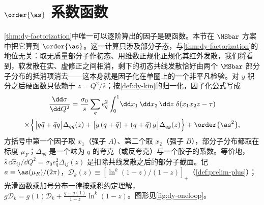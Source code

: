\section{\texorpdfstring{$\order{\as}$}{O(alpha_s)} 系数函数}\label{sec:dy-nlo}

\cref{thm:dy-factorization}中唯一可以逐阶算出的因子是硬函数。本节在 $\MSbar$ 方案中把它算到 $\order{\as}$。这一计算只涉及部分子态，与\cref{thm:dy-factorization}的地位无关：取无质量部分子作初态、用维数正规化正规化其红外发散，我们将看到，软发散在实、虚修正之间相消，剩下的初态共线发散恰好由两个 $\MSbar$ 部分子分布的抵消项消去——这本身就是因子化在单圈上的一个非平凡检验。对 $y$ 积分之后硬函数只依赖于 $z=Q^2/\hat s$；按\cref{def:dy-kin}的归一化，因子化公式写成
\begin{multline}\label{eq:dy-fact-nlo}
\frac{\dd\sigma}{\dd Q^2}=\frac{\sigma_0}{s}\sum_qe_q^2\int_0^1\!\dd x_1\,\dd x_2\,\dd z\;\delta(x_1x_2z-\tau)\\
\times\Big\{\big[q\bar q+\bar qq\big]\Delta_{q\bar q}(z)+\big[g\,(q+\bar q)+(q+\bar q)\,g\big]\Delta_{qg}(z)\Big\}+\order{\as^2},
\end{multline}
方括号中第一个因子取 $x_1$（强子 $A$）、第二个取 $x_2$（强子 $B$），部分子分布都取在标度 $\mu_F$；$\Delta_{qg}$ 是一个味为 $q$ 的夸克（或反夸克）与一个胶子的系数。等价地，$\hat s\,\dd\hat\sigma_{ij}/\dd Q^2=\sigma_0e_q^2\Delta_{ij}(z)$ 是扣除共线发散之后的部分子截面。记 $a\equiv\as(\mu_R)/(2\pi)$，$\mathcal D_k(z)\equiv[\ln^k(1-z)/(1-z)]_+$（\cref{def:prelim-plus}）；光滑函数乘加号分布一律按乘积约定理解，$g\mathcal D_k=g(1)\mathcal D_k+\frac{g-g(1)}{1-z}\ln^k(1-z)$。图形见\cref{fig:dy-oneloop}。

